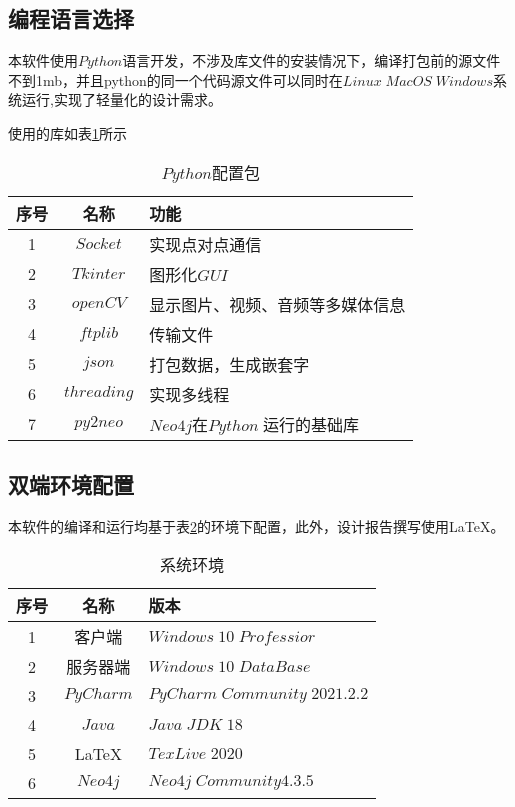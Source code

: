 \documentclass[forprint]{OSPaper}
\begin{document}
\subsection{编程语言选择}

本软件使用$ Python $语言开发，不涉及库文件的安装情况下，编译打包前的源文件不到1mb，并且python的同一个代码源文件可以同时在$Linux \; MacOS \; Windows$系统运行,实现了轻量化的设计需求。

使用的库如表\ref{table:1}所示
\begin{table}[ht]\centering
	\caption{$Python$配置包}
	\label{table:1}
	\begin{tabular}{ccl}
		\hline
		序号 & 名称       & 功能                           \\ \hline
		1  & $Socket$    & 实现点对点通信                   \\
		2  & $Tkinter$   & 图形化$GUI$                      \\
		3  & $openCV$    & 显示图片、视频、音频等多媒体信息    \\
		4  & $ftplib$    & 传输文件                           \\
		5  & $json$      & 打包数据，生成嵌套字                \\
		6  & $threading$ & 实现多线程                          \\
		7  & $py2neo$    & $Neo4j$在$Python \;$运行的基础库     \\ \hline
	\end{tabular}
\end{table}

\subsection{双端环境配置}

本软件的编译和运行均基于表\ref{table:2}的环境下配置，此外，设计报告撰写使用\LaTeX{}。

\begin{table}[ht]\centering
	\caption{系统环境}
	\label{table:2}
	\begin{tabular}{ccl}
		\hline
		序号 & 名称        & 版本                                                        \\ \hline
		1  & 客户端       & $Windows \;10 \; Professior$                              \\
		2  & 服务器端      & $Windows \; 10 \; DataBase $\\
		3  & $PyCharm$ & $PyCharm \; Community \; 2021.2.2$                        \\
		4  & $Java$    & $Java \; JDK \; 18$                                       \\
		5  & \LaTeX{}   & $TexLive \; 2020$                                      \\
		6  & $Neo4j$   & $Neo4j \; Community 4.3.5$                                \\ \hline
	\end{tabular}
\end{table}
\end{document}
